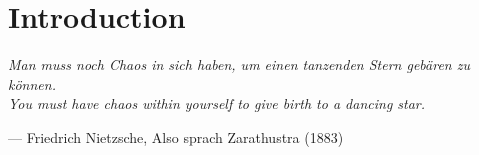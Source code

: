     \fancyfoot[C]{\color{white}\thepage}
    \fancyfoot[L]{\vspace{3.5ex}\tiny\textcolor{white}{Credit: NASA, ESA, CSA, STScI,\\JWST ERO Production Team}}
    \clearpage
    \newpage
    
    \renewcommand{\CurrentTitleColor}{\color{white}}
\fi

\chapter{Introduction}
\label{ch:Introduction}

\ifsetDraft
\else
    \renewcommand{\CurrentTitleColor}{\color{black}}
    
    \vspace*{\fill}
    \setlength{\epigraphwidth}{0.55\textwidth}
    {\color{white} \epigraph{\textit{Man muss noch Chaos in sich haben, um einen tanzenden Stern geb{\"a}ren zu k{\"o}nnen.}
        \\
        \vspace{2ex}
        \textit{You must have chaos within yourself to give birth to a dancing star.}}{--- Friedrich Nietzsche, Also sprach Zarathustra (1883)}}
    \vspace*{\fill}
    
